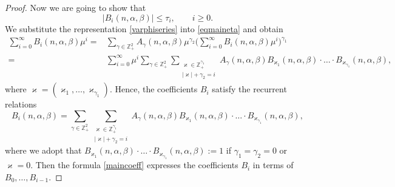 \documentclass[10pt,a4paper]{amsart}
\def\a{\alpha}
\def\b{\beta}
\begin{document}
\begin{proof}
Now we are going to show that
\begin{equation}\label{4.24}
|B_i(n,\a,\b)|\leqslant \tau_i,\qquad i\geqslant0.
\end{equation}
We substitute the representation \eqref{varphiseries} into \eqref{eqmaineta} and obtain
\begin{align*}
\sum\limits_{i=0}^\infty B_i(n,\a,\b)\mu^i=&\sum\limits_{\gamma\in\mathds{Z}_+^2}
A_\gamma(n,\a,\b)\mu^{\gamma_2}
\bigg(\sum\limits_{i=0}^\infty B_i(n,\a,\b)\mu^i\bigg)^{\gamma_1}
\\
=&\sum\limits_{i=0}^\infty\mu^i\sum\limits_{\gamma\in\mathds{Z}_+^2}
\sum\limits_{\substack{\varkappa\in\mathds{Z}_+^{\gamma_1} \\ |\varkappa|+\gamma_2=i}}
A_\gamma(n,\a,\b)B_{\varkappa_1}(n,\a,\b)\cdot\ldots\cdot B_{\varkappa_{\gamma_1}}(n,\a,\b),
\end{align*}
where $\varkappa=(\varkappa_1, \dots, \varkappa_{\gamma_1})$. Hence, the coefficients
$B_i$ satisfy the recurrent relations
\begin{equation}\label{maincoeff}
B_i(n,\a,\b)=\sum\limits_{\gamma\in\mathds{Z}_+^2}
\sum\limits_{\substack{\varkappa\in\mathds{Z}_+^{\gamma_1} \\ |\varkappa|+\gamma_2=i}}
A_\gamma(n,\a,\b)B_{\varkappa_1}(n,\a,\b)\cdot\ldots\cdot B_{\varkappa_{\gamma_1}}(n,\a,\b),
\end{equation}
where we adopt that $B_{\varkappa_1}(n,\a,\b)\cdot\dots\cdot B_{\varkappa_{\gamma_1}}(n,\a,\b):=1$
if $\gamma_1=\gamma_2=0$ or $\varkappa=0$.
Then the formula \eqref{maincoeff} expresses the coefficients $B_i$ in terms of $B_0, \dots, B_{i-1}$.


\end{proof}
\end{document}

